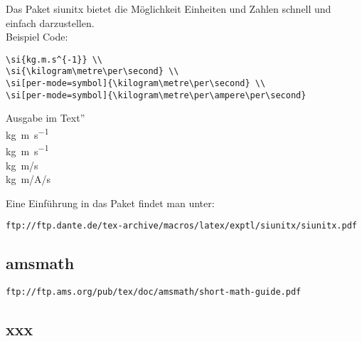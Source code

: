 Das Paket siunitx bietet die M\"oglichkeit Einheiten und Zahlen
schnell und einfach darzustellen.\\
Beispiel Code:
\begin{verbatim}
\si{kg.m.s^{-1}} \\
\si{\kilogram\metre\per\second} \\
\si[per-mode=symbol]{\kilogram\metre\per\second} \\
\si[per-mode=symbol]{\kilogram\metre\per\ampere\per\second}
\end{verbatim}
Ausgabe im Text''\\
\si{kg.m.s^{-1}} \\
\si{\kilogram\metre\per\second} \\
\si[per-mode=symbol]{\kilogram\metre\per\second} \\
\si[per-mode=symbol]{\kilogram\metre\per\ampere\per\second}


Eine Einf\"uhrung in das Paket findet man unter:
\begin{verbatim}
ftp://ftp.dante.de/tex-archive/macros/latex/exptl/siunitx/siunitx.pdf
\end{verbatim}

\subsection{amsmath}
\label{ch:Kapitel1:subsec:amsmath}

\begin{verbatim}
ftp://ftp.ams.org/pub/tex/doc/amsmath/short-math-guide.pdf
\end{verbatim}

\subsection{xxx}
\label{ch:Kapitel1:subsec:xxx}
